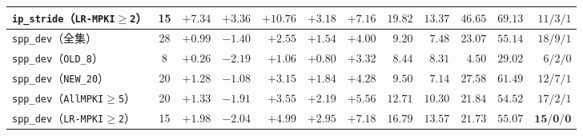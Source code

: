 \documentclass[10.5pt,compsoc,UTF8]{CjC}
\begin{document}
\begin{table}[t]
{\begin{tabular}{@{}lcrrrrrrrrrr@{}}
\texttt{ip\_stride}（\texttt{LR-MPKI$\ge$2}） & 15 & $+7.34$ & $+3.36$ & $\mathbf{+10.76}$ & $\mathbf{+3.18}$ & $\mathbf{+7.16}$ & $19.82$ & $\mathbf{13.37}$ & $46.65$ & $\mathbf{69.13}$ & $11/3/1$ \\
\midrule
\texttt{spp\_dev}（全集） & 28 & $+0.99$ & $-1.40$ & $\mathbf{+2.55}$ & $\mathbf{+1.54}$ & $\mathbf{+4.00}$ & $9.20$ & $\mathbf{7.48}$ & $23.07$ & $\mathbf{55.14}$ & $18/9/1$ \\
\texttt{spp\_dev}（\texttt{OLD\_8}） & 8 & $+0.26$ & $-2.19$ & $\mathbf{+1.06}$ & $+0.80$ & $\mathbf{+3.32}$ & $8.44$ & $\mathbf{8.31}$ & $4.50$ & $\mathbf{29.02}$ & $6/2/0$ \\
\texttt{spp\_dev}（\texttt{NEW\_20}） & 20 & $+1.28$ & $-1.08$ & $\mathbf{+3.15}$ & $\mathbf{+1.84}$ & $\mathbf{+4.28}$ & $9.50$ & $\mathbf{7.14}$ & $27.58$ & $\mathbf{61.49}$ & $12/7/1$ \\
\texttt{spp\_dev}（\texttt{AllMPKI$\ge$5}） & 20 & $+1.33$ & $-1.91$ & $\mathbf{+3.55}$ & $+2.19$ & $+5.56$ & $12.71$ & $\mathbf{10.30}$ & $21.84$ & $\mathbf{54.52}$ & $17/2/1$ \\
\texttt{spp\_dev}（\texttt{LR-MPKI$\ge$2}） & 15 & $+1.98$ & $-2.04$ & $\mathbf{+4.99}$ & $\mathbf{+2.95}$ & $\mathbf{+7.18}$ & $16.79$ & $\mathbf{13.57}$ & $21.73$ & $\mathbf{55.07}$ & $\mathbf{15/0/0}$ \\
\bottomrule
\end{tabular}}
\end{table}
\end{document}
